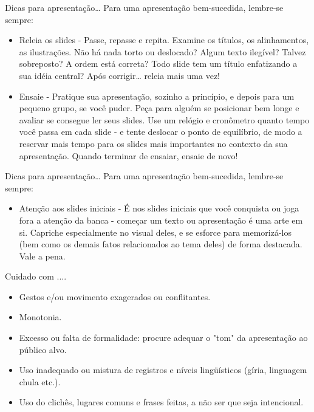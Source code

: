 \documentclass{beamer}
\begin{document}
\begin{frame}{Dicas para apresentação…}
    Para uma apresentação bem-sucedida, lembre-se sempre:
    \begin{itemize}
        \item Releia os slides - Passe, repasse e repita. Examine os títulos, os alinhamentos, as ilustrações. Não há nada torto ou deslocado? Algum texto ilegível? Talvez sobreposto? A ordem está correta? Todo slide tem um título enfatizando a sua idéia central? Após corrigir… releia mais uma vez!
        \item Ensaie - Pratique sua apresentação, sozinho a princípio, e depois para um pequeno grupo, se você puder. Peça para alguém se posicionar bem longe e avaliar se consegue ler seus slides. Use um relógio e cronômetro quanto tempo você passa em cada slide - e tente deslocar o ponto de equilíbrio, de modo a reservar mais tempo para os slides mais importantes no contexto da sua apresentação. Quando terminar de ensaiar, ensaie de novo!       
    \end{itemize}
\end{frame}

\begin{frame}{Dicas para apresentação…}
    Para uma apresentação bem-sucedida, lembre-se sempre:
    \begin{itemize}
        \item Atenção aos slides iniciais - É nos slides iniciais que você conquista ou joga fora a atenção da banca - começar um texto ou apresentação é uma arte em si. Capriche especialmente no visual deles, e se esforce para memorizá-los (bem como os demais fatos relacionados ao tema deles) de forma destacada. Vale a pena.
    \end{itemize}
\end{frame}

\begin{frame}{Cuidado com ....}
    \begin{itemize}
        \item Gestos e/ou movimento exagerados ou conflitantes.
        \item Monotonia.
        \item Excesso ou falta de formalidade: procure adequar o "tom" da apresentação ao público alvo.
        \item Uso inadequado ou mistura de registros e níveis lingüísticos (gíria, linguagem chula etc.).
        \item Uso do clichês, lugares comuns e frases feitas, a não ser que seja intencional.
    \end{itemize}
\end{frame}
\end{document}
